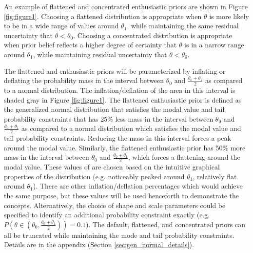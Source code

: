 \documentclass[useAMS,usenatbib,referee]{biom}
\begin{document}
An example of flattened and concentrated enthusiastic priors are shown in Figure \ref{fig:figure1}. Choosing a flattened distribution is appropriate when $\theta$ is more likely to be in a wide range of values around $\theta_1$, while maintaining the same residual uncertainty that $\theta<\theta_0$. Choosing a concentrated distribution is appropriate when prior belief reflects a higher degree of certainty that $\theta$ is in a narrow range around $\theta_1$, while maintaining residual uncertainty that $\theta<\theta_0$. 

The flattened and enthusiastic priors will be parameterized by inflating or deflating the probability mass in the interval between $\theta_0$ and $\frac{\theta_0+\theta_1}{2}$ as compared to a normal distribution. The inflation/deflation of the area in this interval is shaded gray in Figure \ref{fig:figure1}. The flattened enthusiastic prior is defined as the generalized normal distribution that satisfies the modal value and tail probability constraints that has 25\% less mass in the interval between $\theta_0$ and $\frac{\theta_0+\theta_1}{2}$ as compared to a normal distribution which satisfies the modal value and tail probability constraints. Reducing the mass in this interval forces a peak around the modal value. Similarly, the flattened enthusiastic prior has 50\% more mass in the interval between $\theta_0$ and $\frac{\theta_0+\theta_1}{2}$, which forces a flattening around the modal value. These values of are chosen based on the intuitive graphical properties of the distribution (e.g. noticeably peaked around $\theta_1$, relatively flat around $\theta_1$). There are other inflation/deflation percentages which would achieve the same purpose, but these values will be used henceforth to demonstrate the concepts. Alternatively, the choice of shape and scale parameters could be specified to identify an additional probability constraint exactly (e.g. $P(\theta\in(\theta_0,\frac{\theta_0+\theta_1}{2}))=0.1$). The default, flattened, and concentrated priors can all be truncated while maintaining the mode and tail probability constraints. Details are in the appendix (Section \ref{sec:gen_normal_details}).
\end{document}
